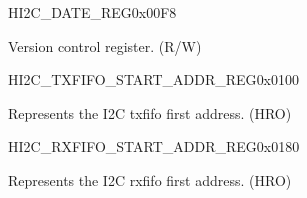 \begin{register}{H}{I2C\_DATE\_REG}{0x00F8}\label{regdesc:I2CDATEREG}
%
\regnewline%
\begin{regdesc}\begin{reglist}
\label{fielddesc:I2CDATE}\item [I2C\_DATE] Version control register. (R/W)
\end{reglist}\end{regdesc}
\end{register}


\begin{register}{H}{I2C\_TXFIFO\_START\_ADDR\_REG}{0x0100}\label{regdesc:I2CTXFIFOSTARTADDRREG}
%
\regnewline%
\begin{regdesc}\begin{reglist}
\label{fielddesc:I2CTXFIFOSTARTADDR}\item [I2C\_TXFIFO\_START\_ADDR] Represents the I2C txfifo first address. (HRO)
\end{reglist}\end{regdesc}
\end{register}


\begin{register}{H}{I2C\_RXFIFO\_START\_ADDR\_REG}{0x0180}\label{regdesc:I2CRXFIFOSTARTADDRREG}
%
\regnewline%
\begin{regdesc}\begin{reglist}
\label{fielddesc:I2CRXFIFOSTARTADDR}\item [I2C\_RXFIFO\_START\_ADDR] Represents the I2C rxfifo first address. (HRO)
\end{reglist}\end{regdesc}
\end{register}
